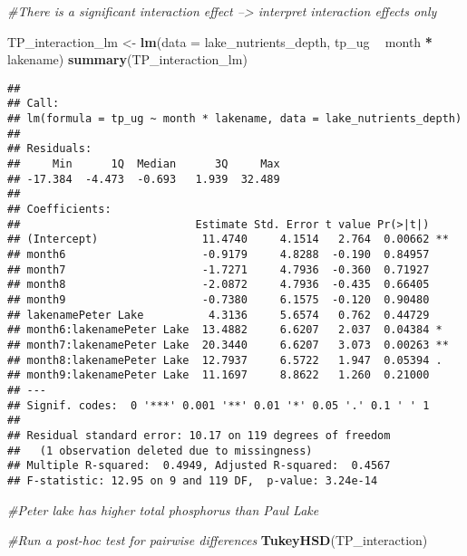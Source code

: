 \documentclass[]{article}
\newenvironment{Shaded}{\begin{snugshade}}{\end{snugshade}}
\newcommand{\CommentTok}[1]{\textcolor[rgb]{0.56,0.35,0.01}{\textit{#1}}}
\newcommand{\DataTypeTok}[1]{\textcolor[rgb]{0.13,0.29,0.53}{#1}}
\newcommand{\KeywordTok}[1]{\textcolor[rgb]{0.13,0.29,0.53}{\textbf{#1}}}
\newcommand{\NormalTok}[1]{#1}
\newcommand{\OperatorTok}[1]{\textcolor[rgb]{0.81,0.36,0.00}{\textbf{#1}}}
\newcommand{\StringTok}[1]{\textcolor[rgb]{0.31,0.60,0.02}{#1}}
\begin{document}
\begin{Shaded}
\begin{Highlighting}[]
\CommentTok{#There is a significant interaction effect --> interpret interaction effects only}

\NormalTok{TP_interaction_lm <-}\StringTok{ }\KeywordTok{lm}\NormalTok{(}\DataTypeTok{data =}\NormalTok{ lake_nutrients_depth, tp_ug }\OperatorTok{~}\StringTok{ }\NormalTok{month }\OperatorTok{*}\StringTok{ }\NormalTok{lakename)}
\KeywordTok{summary}\NormalTok{(TP_interaction_lm)}
\end{Highlighting}
\end{Shaded}

\begin{verbatim}
## 
## Call:
## lm(formula = tp_ug ~ month * lakename, data = lake_nutrients_depth)
## 
## Residuals:
##     Min      1Q  Median      3Q     Max 
## -17.384  -4.473  -0.693   1.939  32.489 
## 
## Coefficients:
##                           Estimate Std. Error t value Pr(>|t|)   
## (Intercept)                11.4740     4.1514   2.764  0.00662 **
## month6                     -0.9179     4.8288  -0.190  0.84957   
## month7                     -1.7271     4.7936  -0.360  0.71927   
## month8                     -2.0872     4.7936  -0.435  0.66405   
## month9                     -0.7380     6.1575  -0.120  0.90480   
## lakenamePeter Lake          4.3136     5.6574   0.762  0.44729   
## month6:lakenamePeter Lake  13.4882     6.6207   2.037  0.04384 * 
## month7:lakenamePeter Lake  20.3440     6.6207   3.073  0.00263 **
## month8:lakenamePeter Lake  12.7937     6.5722   1.947  0.05394 . 
## month9:lakenamePeter Lake  11.1697     8.8622   1.260  0.21000   
## ---
## Signif. codes:  0 '***' 0.001 '**' 0.01 '*' 0.05 '.' 0.1 ' ' 1
## 
## Residual standard error: 10.17 on 119 degrees of freedom
##   (1 observation deleted due to missingness)
## Multiple R-squared:  0.4949, Adjusted R-squared:  0.4567 
## F-statistic: 12.95 on 9 and 119 DF,  p-value: 3.24e-14
\end{verbatim}

\begin{Shaded}
\begin{Highlighting}[]
\CommentTok{#Peter lake has higher total phosphorus than Paul Lake}

\CommentTok{#Run a post-hoc test for pairwise differences}
\KeywordTok{TukeyHSD}\NormalTok{(TP_interaction)}
\end{Highlighting}
\end{Shaded}
\end{document}
